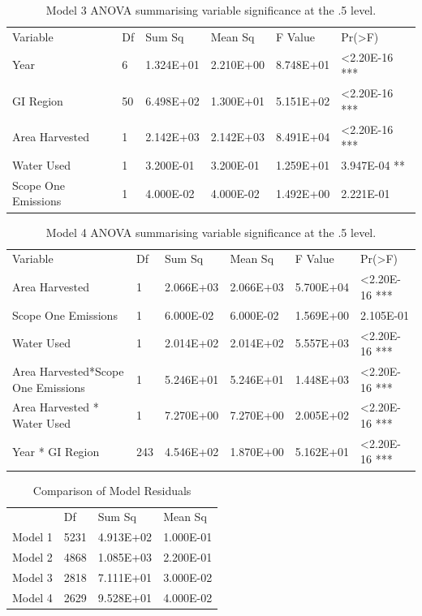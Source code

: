 \documentclass[review,12pt,authoryear]{elsarticle}
\begin{document}
\begin{linenumbers}
\begin{table}[]
    \caption{Model 3 ANOVA summarising variable significance at the .5 level.}
    \label{tab:tab8}
    \begin{tabular}{llllll}
    Variable            & Df & Sum Sq    & Mean Sq   & F Value   & Pr(\textgreater{}F)    \\
    Year                & 6  & 1.324E+01 & 2.210E+00 & 8.748E+01 & \textless 2.20E-16 *** \\
    GI Region           & 50 & 6.498E+02 & 1.300E+01 & 5.151E+02 & \textless 2.20E-16 *** \\
    Area Harvested      & 1  & 2.142E+03 & 2.142E+03 & 8.491E+04 & \textless 2.20E-16 *** \\
    Water Used          & 1  & 3.200E-01 & 3.200E-01 & 1.259E+01 & 3.947E-04 **           \\
    Scope One Emissions & 1  & 4.000E-02 & 4.000E-02 & 1.492E+00 & 2.221E-01             
    \end{tabular}
\end{table}

\begin{table}[]
  \label{tab:tab9}
  \caption{Model 4 ANOVA summarising variable significance at the .5 level.}
  \begin{tabular}{llllll}
  Variable            & Df  & Sum Sq    & Mean Sq   & F Value   & Pr(\textgreater{}F)    \\
  Area Harvested      & 1   & 2.066E+03 & 2.066E+03 & 5.700E+04 & \textless 2.20E-16 *** \\
  Scope One Emissions & 1   & 6.000E-02 & 6.000E-02 & 1.569E+00 & 2.105E-01              \\
  Water Used          & 1   & 2.014E+02 & 2.014E+02 & 5.557E+03 & \textless 2.20E-16 *** \\
  Area Harvested*Scope One Emissions & 1 & 5.246E+01 & 5.246E+01 & 1.448E+03 & \textless 2.20E-16 *** \\
  Area Harvested * Water Used        & 1 & 7.270E+00 & 7.270E+00 & 2.005E+02 & \textless 2.20E-16 *** \\
  Year * GI Region    & 243 & 4.546E+02 & 1.870E+00 & 5.162E+01 & \textless 2.20E-16 ***
  \end{tabular}
\end{table}

\begin{table}[]
  \label{tab:tab 10}
  \caption{Comparison of Model Residuals}
  \begin{tabular}{llll}
        & Df   & Sum Sq    & Mean Sq   \\
  Model 1 & 5231 & 4.913E+02 & 1.000E-01 \\
  Model 2 & 4868 & 1.085E+03 & 2.200E-01 \\
  Model 3 & 2818 & 7.111E+01 & 3.000E-02 \\
  Model 4 & 2629 & 9.528E+01 & 4.000E-02
  \end{tabular}
\end{table}


\end{linenumbers}
\end{document}

